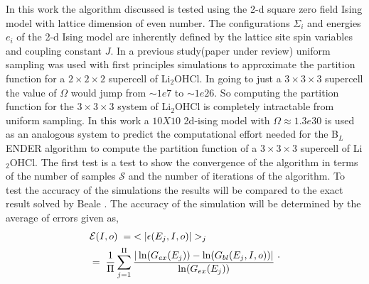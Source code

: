 \documentclass[aps,prl,reprint,superscriptaddress,showkeys]{revtex4-1}
\begin{document}
In this work the algorithm discussed is tested using the 2-d square zero field  Ising model with lattice dimension of even number\cite{exact_statistical,Onsager,Ising}.  The configurations $\Sigma_i$ and energies $e_i$ of the 2-d Ising model are inherently defined by the lattice site spin variables and coupling constant $J$. In a previous study(paper under review) uniform sampling was used with first principles simulations to approximate the partition function for a $2\times 2\times 2$ supercell  of Li$_2$OHCl. In going to just a $3\times 3\times 3$ supercell the value of $\Omega$ would jump from $\sim1e7$ to  $\sim1e26$. So computing the partition function for the $3\times 3\times 3$ system of Li$_2$OHCl is completely intractable from uniform sampling. In this work a $10X10$ 2d-ising model with $\Omega \approx 1.3e30$ is used as an analogous system to predict the computational effort needed for the B$_L$ENDER algorithm to compute the partition function of a  $3\times 3\times 3$ supercell of Li$_2$OHCl.  The first test is a test to show the convergence of the algorithm in terms of the number of samples $\mathcal{S}$ and the number of iterations of the algorithm. To test the accuracy of the simulations the results will be compared to the exact result solved by Beale \cite{Beale_2d_ising}. The accuracy of the simulation will be determined by the average of errors given as, 
\begin{equation}
\begin{split}
 &\mathcal{E}(I,o) \hspace{0.1cm}= \hspace{0.1cm}< |\epsilon(E_j,I,o)| >_j\\
& = \hspace{0.1cm}  \frac{1}{\Pi} \sum_{j=1}^{\Pi}\frac{|\ln(G_{ex}(E_j))- \ln(G_{bl}(E_j,I,o))|}{\ln(G_{ex}(E_j))}\; 
 \end{split}. 
\end{equation}
\end{document}
